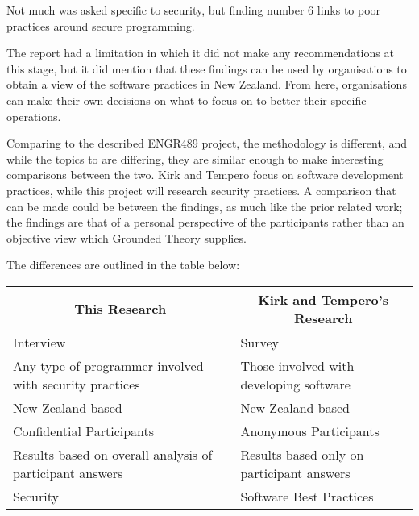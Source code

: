 \par Not much was asked specific to security, but finding number 6 links to poor practices around secure programming. 
\newline
\par The report had a limitation in which it did not make any recommendations at this stage, but it did mention that these findings can be used by organisations to obtain a view of the software practices in New Zealand. From here, organisations can make their own decisions on what to focus on to better their specific operations.  
\newline
\par Comparing to the described ENGR489 project, the methodology is different, and while the topics to are differing, they are similar enough to make interesting comparisons between the two. Kirk and Tempero focus on software development practices, while this project will research security practices. A comparison that can be made could be between the findings, as much like the prior related work; the findings are that of a personal perspective of the participants rather than an objective view which Grounded Theory supplies.
\newline
\par The differences are outlined in the table below:
\newline
\newline
\begin{table}[htb]
\begin{tabular}{|l|l|}
\hline
\multicolumn{1}{|c|}{\textbf{This Research}}             & \multicolumn{1}{c|}{\textbf{Kirk and Tempero's Research}} \\ \hline
Interview                 & Survey                  \\ \hline
Any type of programmer involved with security practices  & Those involved with developing software             \\ \hline
New Zealand based         & New Zealand based       \\ \hline
Confidential Participants & Anonymous Participants  \\ \hline
Results based on overall analysis of participant answers & Results based only on participant answers                 \\ \hline
Security                  & Software Best Practices \\ \hline
\end{tabular}
\end{table}

